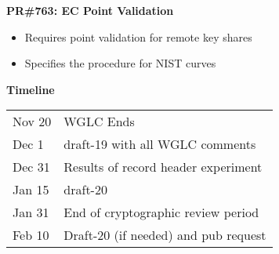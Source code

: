 \documentclass[helvetica]{seminar}
\newcommand{\heading}[1]{%
  \begin{center} 
    \large\bf 
    #1 
  \end{center} 
  \vspace{.4 in}}
\begin{document}
\begin{slide}
\heading{PR\#763: EC Point Validation}

\begin{itemize}
\item Requires point validation for remote key shares
\item Specifies the procedure for NIST curves
\end{itemize}

\end{slide}


\begin{slide}
\heading{Timeline}

\begin{tabular}{l l}
Nov 20 & WGLC Ends \\
Dec 1 & draft-19 with all WGLC comments \\
Dec 31 & Results of record header experiment \\
Jan 15 & draft-20 \\
Jan 31 & End of cryptographic review period \\
Feb 10 & Draft-20 (if needed) and pub request \\
\end{tabular}

\end{slide}
\end{document}
